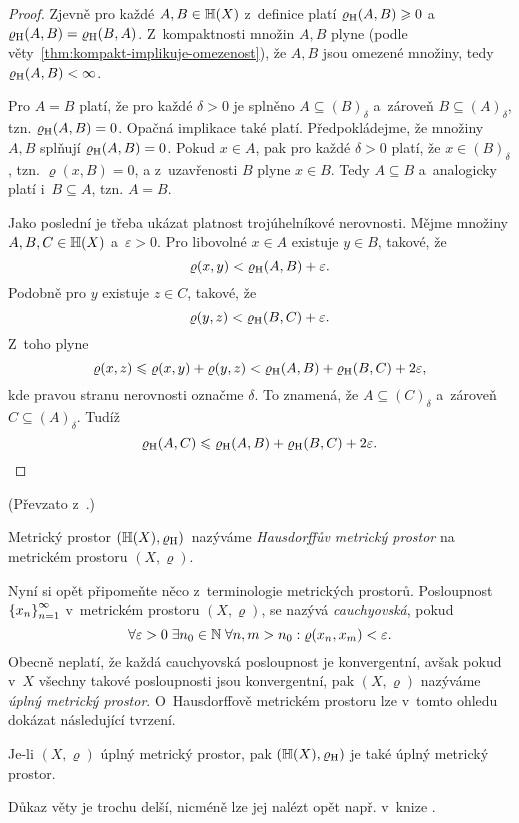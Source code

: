 \begin{proof}
    Zjevně pro každé $A,B\in\mathbb{H}(X)$ z~definice platí $\varrho_\textup{H}(A,B)\geqslant 0$ a~$\varrho_\textup{H}(A,B)=\varrho_\textup{H}(B,A)$. Z~kompaktnosti množin $A,B$ plyne (podle věty~\ref{thm:kompakt-implikuje-omezenost}), že $A,B$ jsou omezené množiny, tedy $\varrho_\textup{H}(A,B)<\infty$.
    
    Pro $A=B$ platí, že pro každé $\delta>0$ je splněno $A\subseteq (B)_\delta$ a~zároveň $B\subseteq (A)_\delta$, tzn. $\varrho_\textup{H}(A,B)=0$. Opačná implikace také platí. Předpokládejme, že množiny $A,B$ splňují $\varrho_\textup{H}(A,B)=0$. Pokud $x\in A$, pak pro každé $\delta>0$ platí, že $x\in (B)_\delta$, tzn. $\varrho(x,B)=0$, a z~uzavřenosti $B$ plyne $x\in B$. Tedy $A\subseteq B$ a~analogicky platí i~$B\subseteq A$, tzn. $A=B$.

    Jako poslední je třeba ukázat platnost trojúhelníkové nerovnosti. Mějme množiny $A,B,C\in\mathbb{H}(X)$ a~$\varepsilon>0$. Pro libovolné $x\in A$ existuje $y\in B$, takové, že
    \[\varrho(x,y)<\varrho_\textup{H}(A,B)+\varepsilon.\]
    Podobně pro $y$ existuje $z\in C$, takové, že
    \[\varrho(y,z)<\varrho_\textup{H}(B,C)+\varepsilon.\]
    Z~toho plyne
    \[\varrho(x,z)\leqslant\varrho(x,y)+\varrho(y,z)<\varrho_\textup{H}(A,B)+\varrho_\textup{H}(B,C)+2\varepsilon,\]
    kde pravou stranu nerovnosti označme $\delta$. To znamená, že $A\subseteq (C)_\delta$ a~zároveň $C\subseteq (A)_\delta$. Tudíž
    \[\varrho_\textup{H}(A,C)\leqslant\varrho_\textup{H}(A,B)+\varrho_\textup{H}(B,C)+2\varepsilon.\]
\end{proof}
(Převzato z~\citep[str. 72]{Edgar2008}.)
\begin{definition}\label{def:hausdorffuv-mp}
    Metrický prostor $(\mathbb{H}(X),\varrho_\textup{H})$~nazýváme \emph{Hausdorffův metrický prostor} na metrickém prostoru $(X,\varrho)$.
\end{definition}
Nyní si opět připomeňte něco z~terminologie metrických prostorů. Posloupnost $\left\{x_n\right\}_{n=1}^\infty$ v~metrickém prostoru $(X,\varrho)$, se nazývá \emph{cauchyovská}, pokud
\[\forall\varepsilon>0\;\exists n_0\in\mathbb{N}\;\forall n,m>n_0: \varrho(x_n,x_m)<\varepsilon.\]
Obecně neplatí, že každá cauchyovská posloupnost je konvergentní, avšak pokud v~$X$ všechny takové posloupnosti jsou konvergentní, pak $(X,\varrho)$ nazýváme \emph{úplný metrický prostor}. O~Hausdorffově metrickém prostoru lze v~tomto ohledu dokázat následující tvrzení.
\begin{theorem}\label{thm:uplnost-hmp}
    Je-li $(X,\varrho)$ úplný metrický prostor, pak $(\mathbb{H}(X),\varrho_\textup{H})$ je také úplný metrický prostor.
\end{theorem}
Důkaz věty je trochu delší, nicméně lze jej nalézt opět např. v~knize \citep[str. 72]{Edgar2008}.